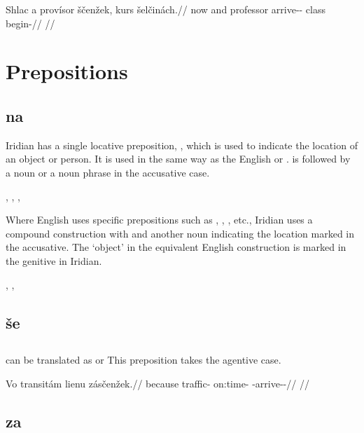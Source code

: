 \pex
\begingl
    \gla Shlac a provísor ščenžek, kurs šelčinách.//
    \glb now and professor arrive-\Av{}-\Pf{} class begin-//
    \glft {}//
\endgl
\xe


\section{Prepositions}

\subsection{na}

Iridian has a single locative preposition, , which is used to indicate the location of an object or person. It is used in the same way as the English  or .  is followed by a noun or a noun phrase in the accusative case.

\pex
\a {}, 
\a {}, 
\a {}, 
\xe

Where English uses specific prepositions such as , , , etc., Iridian uses a compound construction with  and another noun indicating the location marked in the accusative. The `object' in the equivalent English construction is marked in the genitive in Iridian.

\pex
\a {}, 
\a {}, 
\xe

\subsection{še}

\subsection{}

 can be translated as  or  This preposition takes the agentive case.

\pex
\begingl
\gla Vo transitám lienu zásčenžek.//
\glb because traffic-\Agt{} on:time-\Ins{} \Neg{}-arrive-\Av{}-\Pf{}//
\glft {}//
\endgl
\xe

\subsection{za}

